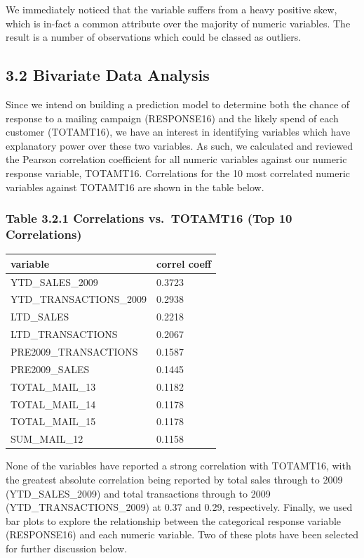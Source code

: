 \documentclass[]{article}
\begin{document}
We immediately noticed that the variable suffers from a heavy positive
skew, which is in-fact a common attribute over the majority of numeric
variables. The result is a number of observations which could be classed
as outliers.

\subsection{3.2 Bivariate Data Analysis}\label{bivariate-data-analysis}

Since we intend on building a prediction model to determine both the
chance of response to a mailing campaign (RESPONSE16) and the likely
spend of each customer (TOTAMT16), we have an interest in identifying
variables which have explanatory power over these two variables. As
such, we calculated and reviewed the Pearson correlation coefficient for
all numeric variables against our numeric response variable, TOTAMT16.
Correlations for the 10 most correlated numeric variables against
TOTAMT16 are shown in the table below.

\subsubsection{Table 3.2.1 Correlations vs.~TOTAMT16 (Top 10
Correlations)}\label{table-3.2.1-correlations-vs.totamt16-top-10-correlations}

\begin{longtable}[]{@{}ll@{}}
\toprule
variable & correl coeff\tabularnewline
\midrule
\endhead
YTD\_SALES\_2009 & 0.3723\tabularnewline
YTD\_TRANSACTIONS\_2009 & 0.2938\tabularnewline
LTD\_SALES & 0.2218\tabularnewline
LTD\_TRANSACTIONS & 0.2067\tabularnewline
PRE2009\_TRANSACTIONS & 0.1587\tabularnewline
PRE2009\_SALES & 0.1445\tabularnewline
TOTAL\_MAIL\_13 & 0.1182\tabularnewline
TOTAL\_MAIL\_14 & 0.1178\tabularnewline
TOTAL\_MAIL\_15 & 0.1178\tabularnewline
SUM\_MAIL\_12 & 0.1158\tabularnewline
\bottomrule
\end{longtable}

None of the variables have reported a strong correlation with TOTAMT16,
with the greatest absolute correlation being reported by total sales
through to 2009 (YTD\_SALES\_2009) and total transactions through to
2009 (YTD\_TRANSACTIONS\_2009) at 0.37 and 0.29, respectively. Finally,
we used bar plots to explore the relationship between the categorical
response variable (RESPONSE16) and each numeric variable. Two of these
plots have been selected for further discussion below.
\end{document}

